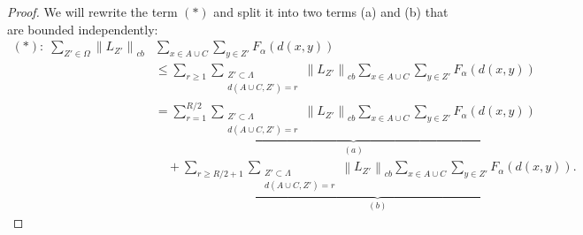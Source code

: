 \documentclass[11pt]{article}
\numberwithin{equation}{section}
\numberwithin{figure}{section}
\numberwithin{table}{section}
\theoremstyle{definition}
\theoremstyle{plain}
\theoremstyle{remark}
\newcommand{\La}{\Lambda}
\newcommand{\normm}[2]{\left\lVert#1\right\rVert_{#2}}
\begin{document}
\begin{proof}
    We will rewrite the term $(*)$ and split it into two terms (a) and (b) that are bounded independently:
    \begin{align}
(*):\;\sum_{Z'\in \Omega} \normm{L_{Z'}}{cb}&\sum_{x\in A\cup C}\sum_{y\in Z'}F_\alpha(d(x,y)) \nonumber\\ 
&\le \sum_{r\ge 1}\sum_{\substack{Z'\subset \La \\ d(A\cup C,Z')= r}}\normm{L_{Z'}}{cb}\sum_{x\in A\cup C}\sum_{y\in Z'}F_\alpha(d(x,y)) \label{eq:(*)split} \\
&= \underbrace{\sum_{r=1}^{R/2}\sum_{\substack{Z'\subset \La \\ d(A\cup C,Z')= r}}\normm{L_{Z'}}{cb}\sum_{x\in A\cup C}\sum_{y\in Z'}F_\alpha(d(x,y))}_{(a)} \nonumber\\
&\quad + \underbrace{\sum_{r\ge R/2+1}\sum_{\substack{Z'\subset \La \\ d(A\cup C,Z')= r}}\normm{L_{Z'}}{cb}\sum_{x\in A\cup C}\sum_{y\in Z'}F_\alpha(d(x,y))}_{(b)}. \nonumber
\end{align}
     


\end{proof}
\end{document}
